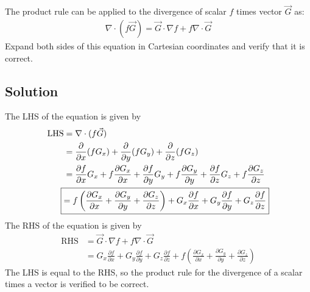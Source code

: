 \section{}

The product rule can be applied to the divergence of scalar $f$ times vector $\vec{G}$ as:
\begin{align*}
    \nabla \cdot (f\vec{G}) = \vec{G} \cdot \nabla f + f\nabla \cdot \vec{G}
\end{align*}
Expand both sides of this equation in Cartesian coordinates and verify that it is correct.

\subsection*{Solution}
The LHS of the equation is given by
\begin{align*}
    \text{LHS} &= \nabla \cdot (f\vec{G}) \\
    &= \frac{\partial}{\partial x}(fG_x) + \frac{\partial}{\partial y}(fG_y) + \frac{\partial}{\partial z}(fG_z) \\
    &= \frac{\partial f}{\partial x}G_x + f\frac{\partial G_x}{\partial x} + \frac{\partial f}{\partial y}G_y + f\frac{\partial G_y}{\partial y} + \frac{\partial f}{\partial z}G_z + f\frac{\partial G_z}{\partial z} \\
    \Aboxed{&= f\left(\frac{\partial G_x}{\partial x} + \frac{\partial G_y}{\partial y} + \frac{\partial G_z}{\partial z}\right) + G_x\frac{\partial f}{\partial x} + G_y\frac{\partial f}{\partial y} + G_z\frac{\partial f}{\partial z}}
\end{align*}
The RHS of the equation is given by
\begin{align*}
    \text{RHS} &= \vec{G} \cdot \nabla f + f\nabla \cdot \vec{G} \\
    &= \boxed{G_x\frac{\partial f}{\partial x} + G_y\frac{\partial f}{\partial y} + G_z\frac{\partial f}{\partial z} + f\left(\frac{\partial G_x}{\partial x} + \frac{\partial G_y}{\partial y} + \frac{\partial G_z}{\partial z}\right)}
\end{align*}
The LHS is equal to the RHS, so the product rule for the divergence of a scalar times a vector is verified to be correct.